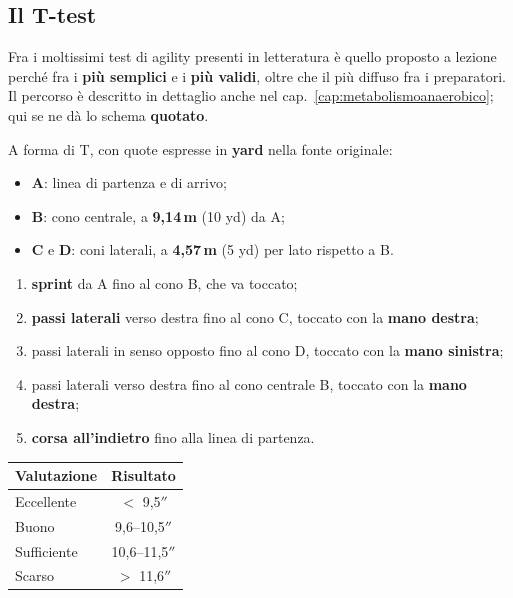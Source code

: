 \subsection{Il T-test}

Fra i moltissimi test di agility presenti in letteratura è quello proposto a lezione perché fra i
\textbf{più semplici} e i \textbf{più validi}, oltre che il più diffuso fra i preparatori. Il
percorso è descritto in dettaglio anche nel cap.~\ref{cap:metabolismoanaerobico}; qui se ne dà lo
schema \textbf{quotato}.

A forma di T, con quote espresse in \textbf{yard} nella fonte originale:
\begin{itemize}
  \item \textbf{A}: linea di partenza e di arrivo;
  \item \textbf{B}: cono centrale, a \textbf{9,14\,m} (10 yd) da A;
  \item \textbf{C} e \textbf{D}: coni laterali, a \textbf{4,57\,m} (5 yd) per lato rispetto a B.
\end{itemize}

\begin{enumerate}
  \item \textbf{sprint} da A fino al cono B, che va toccato;
  \item \textbf{passi laterali} verso destra fino al cono C, toccato con la \textbf{mano destra};
  \item passi laterali in senso opposto fino al cono D, toccato con la \textbf{mano sinistra};
  \item passi laterali verso destra fino al cono centrale B, toccato con la \textbf{mano destra};
  \item \textbf{corsa all'indietro} fino alla linea di partenza.
\end{enumerate}

\begin{table}[htbp]
  \centering
  \small
  \renewcommand{\arraystretch}{1.3}
  \begin{tabularx}{\textwidth}{|X|c|}
    \hline
    \textbf{Valutazione} & \textbf{Risultato} \\
    \hline
    Eccellente & $<$ 9,5$''$ \\
    \hline
    Buono & 9,6--10,5$''$ \\
    \hline
    Sufficiente & 10,6--11,5$''$ \\
    \hline
    Scarso & $>$ 11,6$''$ \\
    \hline
  \end{tabularx}
\end{table}

